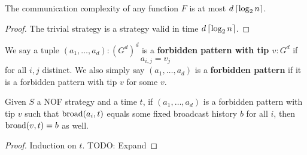 \begin{lemma}
  \label{lem:trivial-bound-function-complexity}

  The communication complexity of any function $F$ is at most $d\left\lceil \log_2 n\right\rceil$.
\end{lemma}
\begin{proof}

  The trivial strategy is a strategy valid in time $d\left\lceil \log_2 n\right\rceil$.
\end{proof}

\begin{definition}
  \label{def:forbidden-pattern}

  We say a tuple $(a_1, \dots, a_d) : (G^d)^d$ is a {\bf forbidden pattern with tip $v : G^d$} if
  $$a_{i, j} = v_j$$
  for all $i, j$ distinct. We also simply say $(a_1, \dots, a_d)$ is a {\bf forbidden pattern} if it is a forbidden pattern with tip $v$ for some $v$.
\end{definition}

\begin{lemma}
  \label{lem:mono-forbidden-pattern-tip}

  Given $S$ a NOF strategy and a time $t$, if $(a_1, \dots, a_d)$ is a forbidden pattern with tip $v$ such that $\operatorname{broad}(a_i, t)$ equals some fixed broadcast history $b$ for all $i$, then $\operatorname{broad}(v, t) = b$ as well.
\end{lemma}
\begin{proof}

  Induction on $t$. TODO: Expand
\end{proof}
